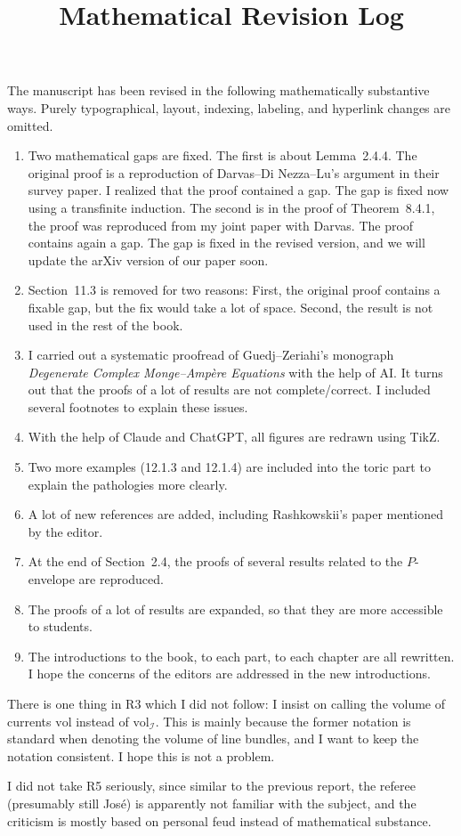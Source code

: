 \documentclass[11pt]{article}
\title{Mathematical Revision Log}
\author{}
\date{}
\begin{document}
\maketitle

The manuscript has been revised in the following mathematically substantive ways. Purely typographical, layout, indexing, labeling, and hyperlink changes are omitted.

\begin{enumerate}
    \item Two mathematical gaps are fixed. The first is about Lemma~2.4.4. The original proof is a reproduction of Darvas--Di Nezza--Lu's argument in their survey paper. I realized that the proof contained a gap. The gap is fixed now using a transfinite induction. The second is in the proof of Theorem~8.4.1, the proof was reproduced from my joint paper with Darvas. The proof contains again a gap. The gap is fixed in the revised version, and we will update the arXiv version of our paper soon.
    \item Section~11.3 is removed for two reasons: First, the original proof contains a fixable gap, but the fix would take a lot of space. Second, the result is not used in the rest of the book.
    \item I carried out a systematic proofread of Guedj--Zeriahi's monograph \emph{Degenerate Complex Monge--Ampère Equations} with the help of AI. It turns out that the proofs of a lot of results are not complete/correct. I included several footnotes to explain these issues.
    \item With the help of Claude and ChatGPT, all figures are redrawn using TikZ.
    \item Two more examples (12.1.3 and 12.1.4) are included into the toric part to explain the pathologies more clearly.
    \item A lot of new references are added, including Rashkowskii's paper mentioned by the editor.
    \item At the end of Section~2.4, the proofs of several results related to the $P$-envelope are reproduced.
    \item The proofs of a lot of results are expanded, so that they are more accessible to students.
    \item The introductions to the book, to each part, to each chapter are all rewritten. I hope the concerns of the editors are addressed in the new introductions.
\end{enumerate}

There is one thing in R3 which I did not follow: I insist on calling the volume of currents $\mathrm{vol}$ instead of $\mathrm{vol}_{\mathcal{I}}$. This is mainly because the former notation is standard when denoting the volume of line bundles, and I want to keep the notation consistent. I hope this is not a problem.

I did not take R5 seriously, since similar to the previous report, the referee (presumably still José) is apparently not familiar with the subject, and the criticism is mostly based on personal feud instead of mathematical substance. 
\end{document}

